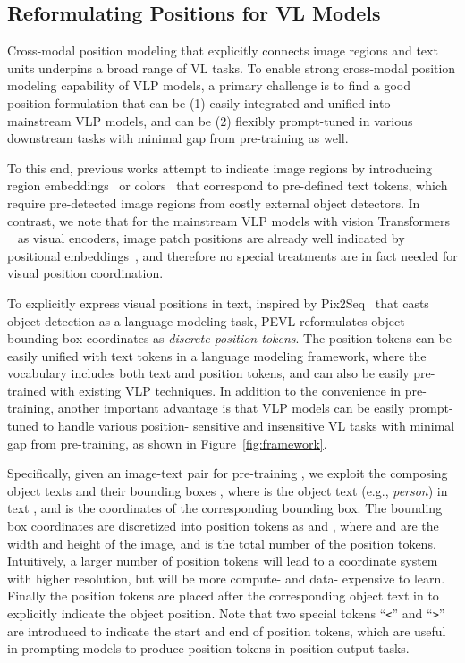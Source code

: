 \documentclass[11pt]{article}
\begin{document}
\subsection{Reformulating Positions for VL Models}
\label{sec:position reformulation}
Cross-modal position modeling that explicitly connects image regions and text units underpins a broad range of VL tasks. To enable strong cross-modal position modeling capability of VLP models, a primary challenge is to find a good position formulation that can be (1) easily integrated and unified into mainstream VLP models, and can be (2) flexibly prompt-tuned in various downstream tasks with minimal gap from pre-training as well. 

To this end, previous works attempt to indicate image regions by introducing region embeddings~\cite{DBLP:conf/icml/ChoLTB21} or colors~\cite{yao2021cpt} that correspond to pre-defined text tokens, which require pre-detected image regions from costly external object detectors. In contrast, we note that for the mainstream VLP models with vision Transformers ~\cite{dosovitskiy2020image} as visual encoders, image patch positions are already well indicated by positional embeddings~\cite{vaswani2017attention}, and therefore no special treatments are in fact needed for visual position coordination. 

To explicitly express visual positions in text, inspired by Pix2Seq~\cite{chen2021pix2seq} that casts object detection as a language modeling task, PEVL reformulates object bounding box coordinates as \textit{discrete position tokens}. The position tokens can be easily unified with text tokens in a language modeling framework, where the vocabulary includes both text and position tokens, and can also be easily pre-trained with existing VLP techniques. In addition to the convenience in pre-training, another important advantage is that VLP models can be easily prompt-tuned to handle various position- sensitive and insensitive VL tasks with minimal gap from pre-training, as shown in Figure~\ref{fig:framework}.

Specifically, given an image-text pair for pre-training , we exploit the composing object texts and their bounding boxes , where  is the object text (e.g., \textit{person}) in text , and  is the coordinates of the corresponding bounding box. The bounding box coordinates are discretized into position tokens as  and , where  and  are the width and height of the image, and  is the 
total number of the position tokens. Intuitively, a larger number of position tokens will lead to a coordinate system with higher resolution, but will be more compute- and data- expensive to learn. Finally the position tokens are placed after the corresponding object text  in  to explicitly indicate the object position. Note that two special tokens ``\texttt{<}'' and ``\texttt{>}'' are introduced to indicate the start and end of position tokens, which are useful in prompting models to produce position tokens in position-output tasks. 
\end{document}
